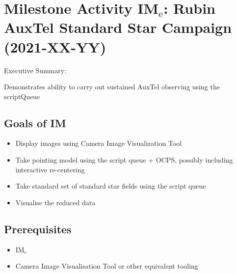 \section{Milestone Activity IM\(_{\text{e}}\): Rubin AuxTel Standard Star Campaign (2021-XX-YY)}
\label{sec:orgafd1039}
Executive Summary:

Demonstrates ability to carry out sustained AuxTel observing using the scriptQueue

\subsection{Goals of IM}
\label{sec:orgbe41e90}
\begin{itemize}
\item Display images using Camera Image Visualization Tool
\item Take pointing model using the script queue + \gls{OCPS}, possibly including interactive re-centering
\item Take standard set of standard star fields using the script queue
\item Visualise the reduced data
\end{itemize}

\subsection{Prerequisites}

\begin{itemize}
\item{IM\(_{\text{c}}\)}
\item{Camera Image Visualisation Tool or other equivalent tooling}
\end{itemize}


